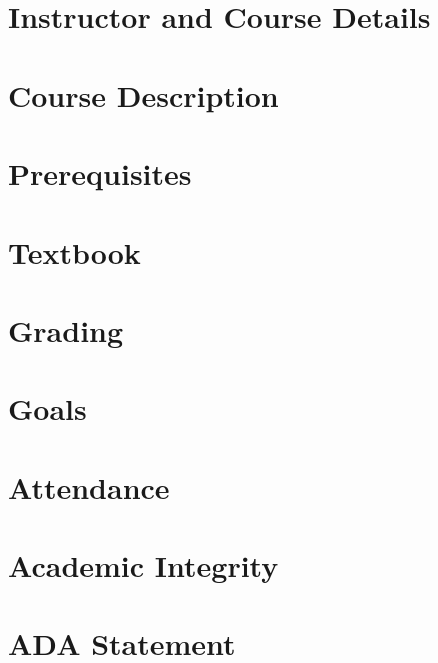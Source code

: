 \documentclass[11pt]{article} %
\title{\coursenumber\\\coursetitle}
\author{}
\date{\semester}
\begin{document}
\pagestyle{fancy} 
\fancyhead{}
\lhead{\coursenumber} %
\rhead{\semester} %

\maketitle

\thispagestyle{fancy}

\section*{Instructor and Course Details}

\section*{Course Description}

\section*{Prerequisites}

\section*{Textbook}
\section*{Grading}

\section*{Goals}

\section*{Attendance}

\section*{Academic Integrity}


\section*{ADA Statement}

\end{document}
